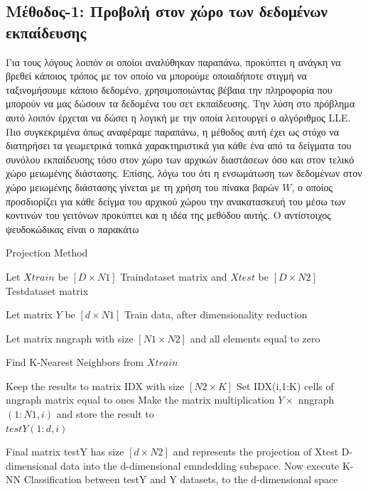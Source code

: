 \subsection{Μέθοδος-1: Προβολή στον χώρο των δεδομένων εκπαίδευσης}
\par
Για τους λόγους λοιπόν οι οποίοι αναλύθηκαν παραπάνω, προκύπτει η ανάγκη να βρεθεί κάποιος τρόπος με τον οποίο να μπορούμε οποιαδήποτε στιγμή να ταξινομήσουμε κάποιο δεδομένο, χρησιμοποιώντας βέβαια την πληροφορία που μπορούν να μας δώσουν τα δεδομένα του σετ εκπαίδευσης. Την λύση στο πρόβλημα αυτό λοιπόν έρχεται να δώσει η λογική με την οποία λειτουργεί ο αλγόριθμος \textlatin{LLE}. Πιο συγκεκριμένα όπως αναφέραμε παραπάνω, η μέθοδος αυτή έχει ως στόχο να διατηρήσει τα γεωμετρικά τοπικά χαρακτηριστικά για κάθε ένα από τα δείγματα του συνόλου εκπαίδευσης τόσο στον χώρο των αρχικών διαστάσεων όσο και στον τελικό χώρο μειωμένης διάστασης. Επίσης, λόγω του ότι η ενσωμάτωση των δεδομένων στον χώρο μειωμένης διάστασης γίνεται με τη χρήση του πίνακα βαρών $W$, ο οποίος προσδιορίζει για κάθε δείγμα του αρχικού χώρου την ανακατασκευή του μέσω των κοντινών του γειτόνων προκύπτει και η ιδέα της μεθόδου αυτής. Ο αντίστοιχος ψευδοκώδικας είναι ο παρακάτω
\begin{algorithm}
   \caption{Projection Method}
    \begin{algorithmic}[1]   	
    	\State Let $Xtrain$ be $[D \times N1]$ Train\textunderscore dataset matrix and $Xtest$ be $[D \times N2]$ Test\textunderscore dataset matrix 
		\State 
    	
    	\State Let matrix $Y$ be $[d \times N1]$ Train data, after dimensionality reduction 
    	\State
    	
    	\State Let matrix nn\textunderscore graph with size $[N1 \times N2]$ and all elements equal to zero
    	\State 
        
            \State Find K-Nearest Neighbors from $Xtrain$
        \EndFor
        \State
		
		\State Keep the results to matrix IDX with size $[N2 \times K]$ 
            \State Set IDX(i,1:K) cells of nn\textunderscore graph matrix equal to ones
            \State Make the matrix multiplication $Y \times$ nn\textunderscore graph$(1:N1,i)$ and store the result to \\ $testY(1:d,i)$ 
        \EndFor
        \State 
        
        \State Final matrix testY has size $[d \times N2]$ and represents the projection of Xtest D-dimensional data into the d-dimensional emndedding subspace.  
        \State
        \State Now execute K-NN Classification between testY and Y datasets, to the d-dimensional space
	\end{algorithmic}
\end{algorithm}
